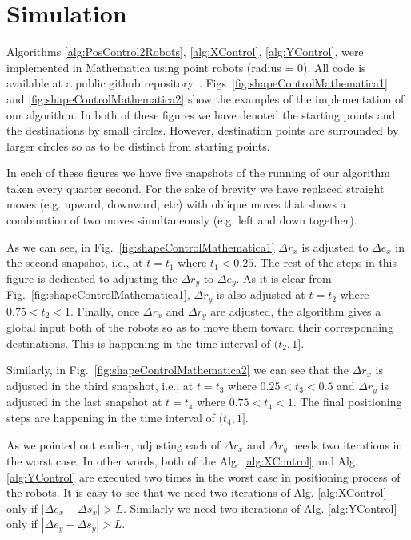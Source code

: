
\section{Simulation}\label{sec:simulation}




Algorithms \ref{alg:PosControl2Robots}, \ref{alg:XControl}, \ref{alg:YControl}, were implemented in Mathematica using point robots (radius = $0$).  All code is available at a public github repository~\cite{Shahrokhi2015GitHubShapeControl}.  Figs~\ref{fig:shapeControlMathematica1} and \ref{fig:shapeControlMathematica2} show the examples of the implementation of our algorithm. In both of these figures we have denoted the starting points and the destinations by small circles. However, destination points are surrounded by larger circles so as to be distinct from starting points. 

In each of these figures we have five snapshots of the running of our algorithm taken every quarter second. For the sake of brevity we have replaced straight moves (e.g. upward, downward, etc) with oblique moves that shows a combination of two moves simultaneously (e.g. left and down together). 

As we can see, in Fig.~\ref{fig:shapeControlMathematica1} $\Delta r_x$ is adjusted to $\Delta e_x$ in the second snapshot, i.e., at $t = t_1$ where $t_1<0.25$. The rest of the steps in this figure is dedicated to adjusting the $\Delta r_y$ to $\Delta e_y$. As it is clear from Fig.~\ref{fig:shapeControlMathematica1}, $\Delta r_y$ is also adjusted at $t = t_2$ where $0.75<t_2<1$. Finally, once $\Delta r_x$ and $\Delta r_y$ are adjusted, the algorithm gives a global input both of the robots so as to move them toward their corresponding destinations. This is happening in the time interval of $(t_2,1]$.

Similarly, in Fig.~\ref{fig:shapeControlMathematica2} we can see that the $\Delta r_x$ is adjusted in the third snapshot, i.e., at $t=t_3$ where $0.25<t_3<0.5$ and $\Delta r_y$ is adjusted in the last snapshot at $t=t_4$ where $0.75<t_4<1$. The final positioning steps are happening in the time interval of $(t_4,1]$.

As we pointed out earlier, adjusting each of $\Delta r_x$ and $\Delta r_y$ needs two iterations in the worst case. In other words, both of the Alg. \ref{alg:XControl} and Alg. \ref{alg:YControl} are executed two times in the worst case in positioning process of the robots. It is easy to see that we need two iterations of Alg. \ref{alg:XControl} only if $|\Delta e_x - \Delta s_x|>L$. Similarly we need two iterations of Alg. \ref{alg:YControl} only if $|\Delta e_y - \Delta s_y|>L$.




